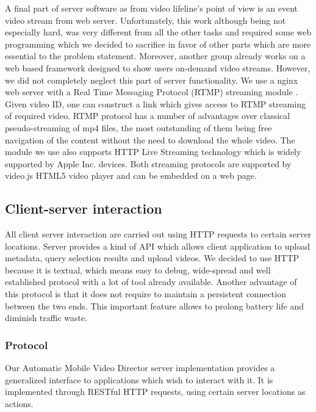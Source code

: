 \documentclass[conference]{IEEEtran}
\begin{document}
A final part of server software as from video lifeline's point of view is an event video stream from web server.
Unfortunately, this work although being not especially hard, was very different from all the other tasks and
required some web programming which we decided to sacrifice in favor of other parts which are more essential to the problem statement.
Moreover, another group already works on a web based framework designed to show users on-demand video streams.
However, we did not completely neglect this part of server functionality. 
We use a nginx \cite{nginx} web server with a Real Time Messaging Protocol (RTMP) streaming module \cite{nginx-rtmp-module}.
Given video ID, one can construct a link which gives access to RTMP streaming of required video.
RTMP protocol has a number of advantages over classical pseudo-streaming of mp4 files, the most outstanding of them being
free navigation of the content without the need to download the whole video.
The module we use also supports HTTP Live Streaming technology \cite{apple-hls} which is widely supported by Apple Inc. devices.
Both streaming protocols are supported by video.js \cite{video-js} HTML5 video player and can be embedded on a web page.

\subsection{Client-server interaction}

All client server interaction are carried out using HTTP requests to certain server locations.
Server provides a kind of API which allows client application to upload metadata, query selection results and upload videos.
We decided to use HTTP because it is textual, which means easy to debug, 
wide-spread and well established protocol with a lot of tool already available. 
Another advantage of this protocol is that it does not require to maintain a persistent connection between the two ends.
This important feature allows to prolong battery life and diminish traffic waste.

\subsubsection{Protocol}

Our Automatic Mobile Video Director server implementation provides 
a generalized interface to applications which wish to interact with it. 
It is implemented through RESTful HTTP requests, using certain server locations as actions.
\end{document}
